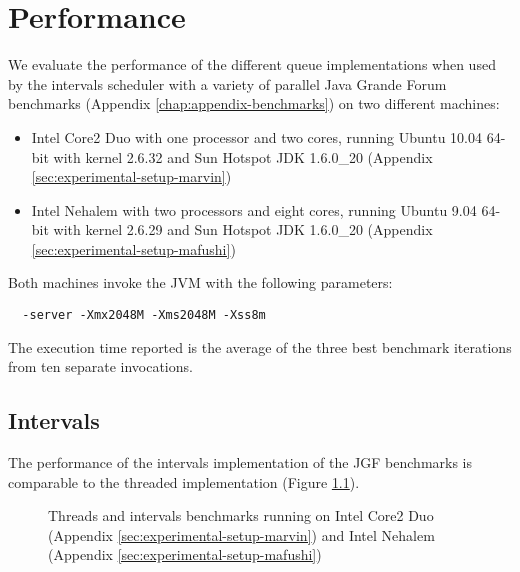 
\chapter{Performance}
\label{chap:queues-performance}

We evaluate the performance of the different queue implementations
when used by the intervals scheduler with a variety of parallel Java
Grande Forum benchmarks (Appendix \ref{chap:appendix-benchmarks}) on
two different machines:

\begin{itemize}
\item Intel Core2 Duo with one processor and two cores, running Ubuntu
  10.04 64-bit with kernel 2.6.32 and Sun Hotspot JDK 1.6.0\_20
  (Appendix \ref{sec:experimental-setup-marvin})
\item Intel Nehalem with two processors and eight cores, running
  Ubuntu 9.04 64-bit with kernel 2.6.29 and Sun Hotspot JDK 1.6.0\_20
  (Appendix \ref{sec:experimental-setup-mafushi})
\end{itemize}

Both machines invoke the JVM with the following parameters:

\begin{lstlisting}
  -server -Xmx2048M -Xms2048M -Xss8m
\end{lstlisting}

The execution time reported is the average of the three best benchmark
iterations from ten separate invocations.


\section{Intervals}
\label{sec:queues-performance-intervals}

The performance of the intervals implementation of the JGF benchmarks
is comparable to the threaded implementation (Figure
\ref{fig:queues-performance-threads}).

\begin{figure}[htb]
  \centering
  \caption{Threads and intervals benchmarks running on Intel Core2 Duo
    (Appendix \ref{sec:experimental-setup-marvin}) and Intel
    Nehalem (Appendix \ref{sec:experimental-setup-mafushi})}
  \label{fig:queues-performance-threads}
\end{figure}

